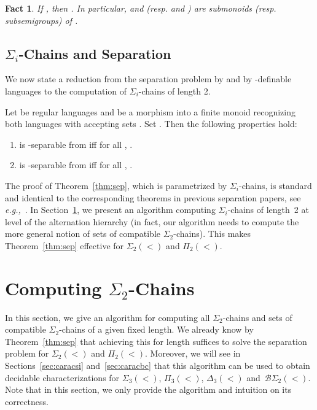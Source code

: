 \documentclass[envcountsame]{llncs}
\newcommand{\sic}[1]{\ensuremath{\Sigma_{#1}}\xspace}
\newcommand{\siwd}{\ensuremath{\Sigma_{2}(<)}\xspace}
\newcommand{\piwd}{\ensuremath{\Pi_{2}(<)}\xspace}
\newcommand{\bswd}{\ensuremath{\mathcal{B}\Sigma_{2}(<)}\xspace}
\newcommand{\dewt}{\ensuremath{\Delta_{3}(<)}\xspace}
\newcommand{\siwt}{\ensuremath{\Sigma_{3}(<)}\xspace}
\newcommand{\piwt}{\ensuremath{\Pi_{3}(<)}\xspace}
\newcommand\qchains[1]{\ensuremath{\sic{#1}}-chains\xspace}
\newcommand\qChains[1]{\ensuremath{\sic{#1}}-Chains\xspace}
\newcommand\ichains{\qchains{i}}
\newcommand\dchains{\qchains{2}}
\newcommand\iChains{\qChains{i}}
\newcommand\dChains{\qChains{2}}
\newtheorem{fact}[theorem]{Fact}
\begin{document}
\begin{fact} \label{fct:setcomp} If , then
  .  In
  particular,  and  (resp. 
  and ) are submonoids (resp. subsemigroups) of .
\end{fact}


\subsection{\iChains and Separation}
We now state a reduction from the separation problem by  and by
-definable languages to the computation of \ichains of length 2.


\begin{theorem} \label{thm:sep}
  Let  be regular languages and  be
  a morphism into a finite monoid recognizing both languages with
  accepting sets . Set . Then the
  following properties hold:
  \begin{enumerate}
  \item  is -separable from  iff for all , .
  \item  is -separable from  iff for all , .
  \end{enumerate}
\end{theorem}





The proof of Theorem~\ref{thm:sep}, which is parametrized by \ichains, is
standard and identical to the corresponding theorems in previous separation
papers, see \emph{e.g.,}~\cite{pzfo}. In Section~\ref{sec:comput}, we present
an algorithm computing \ichains of length~2 at level  of the
alternation hierarchy (in fact, our algorithm needs to compute the more
general notion of sets of compatible \dchains). This makes
Theorem~\ref{thm:sep} effective for \siwd and \piwd.



\section{Computing \dChains}
\label{sec:comput}
In this section, we give an algorithm for computing all \dchains and
sets of compatible \dchains of a given fixed length. We already know
by Theorem~\ref{thm:sep} that achieving this for length  suffices
to solve the separation problem for \siwd and \piwd. Moreover, we will
see in Sections~\ref{sec:caracsi} and~\ref{sec:caracbc} that this
algorithm can be used to obtain decidable characterizations for 
\siwt, \piwt, \dewt and~\bswd. Note that in this section, we only provide the
algorithm and intuition on its correctness.
\end{document}
